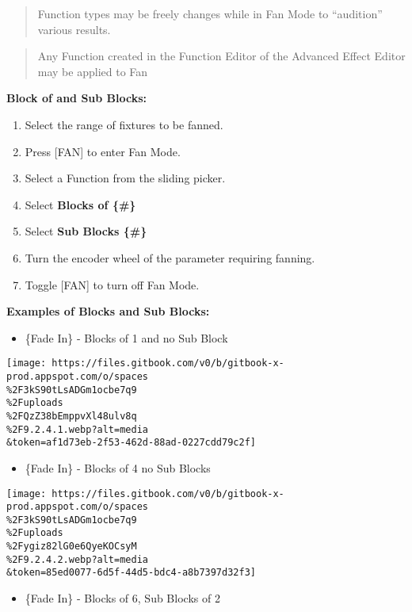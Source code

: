 \documentclass[
]{article}
\providecommand{\tightlist}{%
  \setlength{\itemsep}{0pt}\setlength{\parskip}{0pt}}
\begin{document}
\begin{quote}
Function types may be freely changes while in Fan Mode to ``audition'' various results.
\end{quote}

\begin{quote}
Any Function created in the Function Editor of the Advanced Effect Editor may be applied to Fan
\end{quote}

\textbf{Block of and Sub Blocks:}

\begin{enumerate}
\def\labelenumi{\arabic{enumi}.}
\item
  Select the range of fixtures to be fanned.
\item
  Press {[}FAN{]} to enter Fan Mode.
\item
  Select a Function from the sliding picker.
\item
  Select \textbf{Blocks of \{\#\}}
\item
  Select \textbf{Sub Blocks \{\#\}}
\item
  Turn the encoder wheel of the parameter requiring fanning.
\item
  Toggle {[}FAN{]} to turn off Fan Mode.
\end{enumerate}

\textbf{Examples of Blocks and Sub Blocks:}

\begin{itemize}
\tightlist
\item
  \{Fade In\} - Blocks of 1 and no Sub Block
\end{itemize}

\texttt{[image: https://files.gitbook.com/v0/b/gitbook-x-prod.appspot.com/o/spaces\\\%2F3kS90tLsADGm1ocbe7q9\\\%2Fuploads\\\%2FQzZ38bEmppvXl48ulv8q\\\%2F9.2.4.1.webp?alt=media\\\&token=af1d73eb-2f53-462d-88ad-0227cdd79c2f]}

\begin{itemize}
\tightlist
\item
  \{Fade In\} - Blocks of 4 no Sub Blocks
\end{itemize}

\texttt{[image: https://files.gitbook.com/v0/b/gitbook-x-prod.appspot.com/o/spaces\\\%2F3kS90tLsADGm1ocbe7q9\\\%2Fuploads\\\%2Fygiz82lG0e6QyeKOCsyM\\\%2F9.2.4.2.webp?alt=media\\\&token=85ed0077-6d5f-44d5-bdc4-a8b7397d32f3]}

\begin{itemize}
\tightlist
\item
  \{Fade In\} - Blocks of 6, Sub Blocks of 2
\end{itemize}
\end{document}
